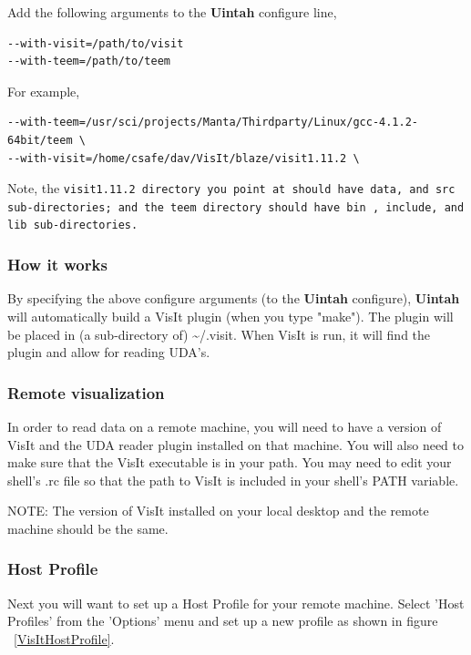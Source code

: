 \documentclass[12pt]{article}
\begin{document}
Add the following arguments to the \textbf{Uintah} configure line,

\begin{verbatim}
--with-visit=/path/to/visit 
--with-teem=/path/to/teem
\end{verbatim}

For example,

\begin{verbatim}
--with-teem=/usr/sci/projects/Manta/Thirdparty/Linux/gcc-4.1.2-64bit/teem \
--with-visit=/home/csafe/dav/VisIt/blaze/visit1.11.2 \
\end{verbatim}

Note, the \tt visit1.11.2 \normalfont directory you point at should
have \tt data\normalfont , and \tt src \normalfont sub-directories;
and the \tt teem \normalfont directory should have \tt bin\normalfont
, \tt include\normalfont , and \tt lib \normalfont sub-directories.

\subsubsection{How it works}
By specifying the above configure arguments (to the \textbf{Uintah}
configure), \textbf{Uintah} will automatically build a VisIt plugin
(when you type "make"). The plugin will be placed in (a sub-directory
of) \textasciitilde/.visit. When VisIt is run, it will find the plugin
and allow for reading UDA's.

\subsubsection{Remote visualization}
In order to read data on a remote machine, you will need to have a
version of VisIt and the UDA reader plugin installed on that
machine. You will also need to make sure that the VisIt executable is
in your path. You may need to edit your shell's .rc file so that the
path to VisIt is included in your shell's PATH variable.

NOTE: The version of VisIt installed on your local desktop and the
remote machine should be the same.

\subsubsection{Host Profile}
Next you will want to set up a Host Profile for your remote
machine. Select 'Host Profiles' from the 'Options' menu and set up a
new profile as shown in figure ~\ref{VisItHostProfile}.
\end{document}
